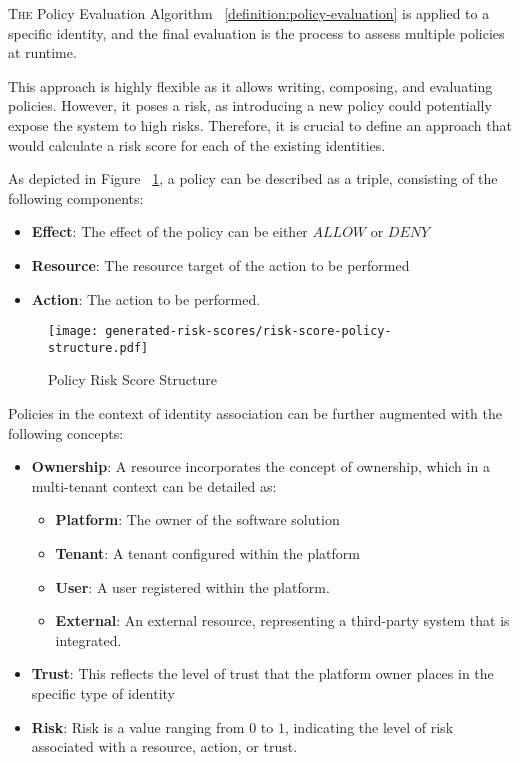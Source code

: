 \lettrine{T}{he} Policy Evaluation Algorithm ~\ref{definition:policy-evaluation} is applied to a specific identity, and the final evaluation is the process to assess multiple policies at runtime. 

\vspace{15pt}

This approach is highly flexible as it allows writing, composing, and evaluating policies. 
However, it poses a risk, as introducing a new policy could potentially expose the system to high risks. Therefore, it is crucial to define an approach that would calculate a risk score for each of the existing identities.

\vspace{15pt}

As depicted in Figure ~\ref{fig:risk-score-policy-structure}, a policy can be described as a triple, consisting of the following components:

\begin{itemize}
    \item \textbf{Effect}: The effect of the policy can be either $ALLOW$ or $DENY$
    \item \textbf{Resource}: The resource target of the action to be performed
    \item \textbf{Action}: The action to be performed.
\end{itemize}

\begin{figure}[h]
    \centering
    \texttt{[image: generated-risk-scores/risk-score-policy-structure.pdf]}
    \caption{Policy Risk Score Structure}
    \label{fig:risk-score-policy-structure}
\end{figure}

Policies in the context of identity association can be further augmented with the following concepts:
\begin{itemize}
    \item \textbf{Ownership}: A  resource incorporates the concept of ownership, which in a multi-tenant context can be detailed as:
    \begin{itemize}
        \item \textbf{Platform}: The owner of the software solution
        \item \textbf{Tenant}: A tenant configured within the platform
        \item \textbf{User}: A user registered within the platform.
        \item \textbf{External}: An external resource, representing a third-party system that is integrated.
     \end{itemize}
    \item \textbf{Trust}: This reflects the level of trust that the platform owner places in the specific type of identity
    \item \textbf{Risk}: Risk is a value ranging from $0$ to $1$, indicating the level of risk associated with a resource, action, or trust.
\end{itemize}

